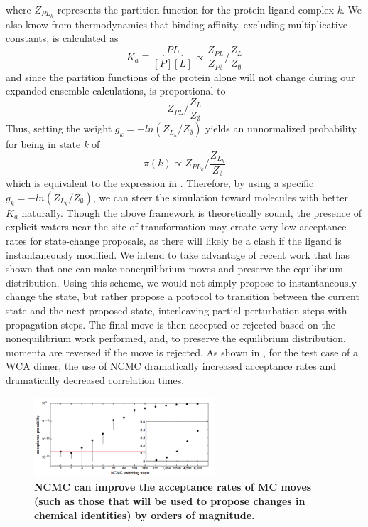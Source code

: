 \documentclass[12pt]{article}
\begin{document}
where $Z_{PL_k}$ represents the partition function for the protein-ligand complex \textit{k}.
We also know from thermodynamics that binding affinity, excluding multiplicative constants, is calculated as \cite{gilson1997}
\begin{equation} \label{eq:binding}K_a \equiv \frac{[PL]}{[P][L]} \propto \frac{Z_{PL}}{Z_{P\emptyset}} / \frac{Z_L}{Z_\emptyset} \end{equation}
%
and since the partition functions of the protein alone will not change during our expanded ensemble calculations,  is proportional to
%
\begin{equation} \label{eq:propbind} Z_{PL} /  \frac{Z_L}{Z_\emptyset} \end{equation}
%
Thus, setting the weight $g_k=-ln(Z_{L_k} / Z_\emptyset)$ yields an unnormalized probability for being in state \textit{k} of
%
\begin{equation} \label{eq:biasedk} \pi(k) \propto Z_{PL_k} / \frac{Z_{L_k}}{Z_\emptyset} \end{equation}
%
which is equivalent to the expression in . Therefore, by using a specific $g_k = -ln(Z_{L_k} / Z_\emptyset)$, we can steer the simulation toward molecules with better $K_{a}$ naturally. Though the above framework is theoretically sound, the presence of explicit waters near the site of transformation may create very low acceptance rates for state-change proposals, as there will likely be a clash if the ligand is instantaneously modified. We intend to take advantage of recent work \cite{nilmeier2011} that has shown that one can make nonequilibrium moves and preserve the equilibrium distribution. Using this scheme, we would not simply propose to instantaneously change the state, but rather propose a protocol to transition between the current state and the next proposed state, interleaving partial perturbation steps with propagation steps. The final move is then accepted or rejected based on the nonequilibrium work performed, and, to preserve the equilibrium distribution, momenta are reversed if the move is rejected. As shown in , for the test case of a WCA dimer, the use of NCMC dramatically increased acceptance rates and dramatically decreased correlation times.

\begin{figure}
\centering
\includegraphics[width=0.6\textwidth]{ncmc.png}
\caption{\textbf{NCMC can improve the acceptance rates of MC moves (such as those that will be used to propose changes in chemical identities) by orders of magnitude.}\cite{nilmeier2011}}
\label{ncmcfig}
\end{figure}
\end{document}

